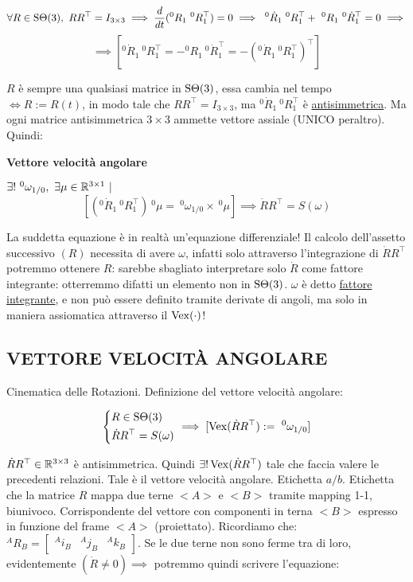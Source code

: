 \[	
	\forall R\in\SO(3),\ RR^\top = I_{3\times 3} \implies \frac{d}{dt}({^0}R_1\ ^0R_1^\top) = 0 \implies\ ^0\dot{R}_1\ ^0R_1^\top +\ ^0R_1\ ^0\dot{R}_1^\top = 0 \implies
\]
\[
	\implies [{^0}\dot{R}_1\ ^0R_1^\top = -{^0}R_1\ ^0\dot{R}_1^\top = -({^0}\dot{R}_1\ ^0R_1^\top)^\top]
\]

$R$ è sempre una qualsiasi matrice in $\operatorname{S\Theta}(3)$, essa cambia nel tempo $\iff R := R(t)$, in modo tale che $RR^\top=I_{3\times 3}$, ma $^0\dot{R}_1\ ^0R_1^\top$ è \underline{antisimmetrica}. Ma ogni matrice antisimmetrica $3\times 3$ ammette vettore assiale (UNICO peraltro). Quindi:

\begin{defn}{\textbf{Vettore velocità angolare}}

$\exists!\ ^0\omega_{1/0},\ \exists\mu\in\R^{3\times 1}\ |$
\[
	[({^0}\dot{R}_1\ ^0R_1^\top)\ ^0\mu =\ ^0\omega_{1/0}\times\ ^0\mu] \implies \dot{R}R^\top = S(\omega)
\]

\end{defn}

La suddetta equazione è in realtà un'equazione differenziale! Il calcolo dell'assetto successivo $(R)$ necessita di avere $\omega$, infatti solo attraverso l'integrazione di $\dot{R}R^\top$ potremmo ottenere $R$: sarebbe sbagliato interpretare solo $\dot{R}$ come fattore integrante: otterremmo difatti un elemento non in $\operatorname{S\Theta}(3)$.
$\omega$ è detto \underline{fattore integrante}, e non può essere definito tramite derivate di angoli, ma solo in maniera assiomatica attraverso il $\operatorname{Vex}(\mathord{\cdot})$!

\subsection{VETTORE VELOCIT\`A ANGOLARE}

Cinematica delle Rotazioni. Definizione del vettore velocità angolare:

\[
	\left\{
	\begin{aligned}
	&R\in\SO(3)\\
	&\dot{R}R^\top = S(\omega)
	\end{aligned}
	\right.\implies [\Vex(\dot{R}R^\top) :=\ ^0\omega_{1/0}]
\]

$\dot{R}R^\top\in\mathbb{R}^{3\times 3}$ è antisimmetrica. Quindi $\exists! \operatorname{Vex}(\dot{R}R^\top)$ tale che faccia valere le precedenti relazioni. Tale è il vettore velocità angolare. Etichetta $a/b$. Etichetta che la matrice $R$ mappa due terne $<A>$ e $<B>$ tramite mapping 1-1, biunivoco. Corrispondente del vettore con componenti in terna $<B>$ espresso in funzione del frame $<A>$ (proiettato). Ricordiamo che: $^AR_B = \begin{bmatrix}^Ai_B&^Aj_B&^Ak_B\end{bmatrix}$. Se le due terne non sono ferme tra di loro, evidentemente $(\dot{R}\neq 0) \implies$ potremmo quindi scrivere l'equazione:

